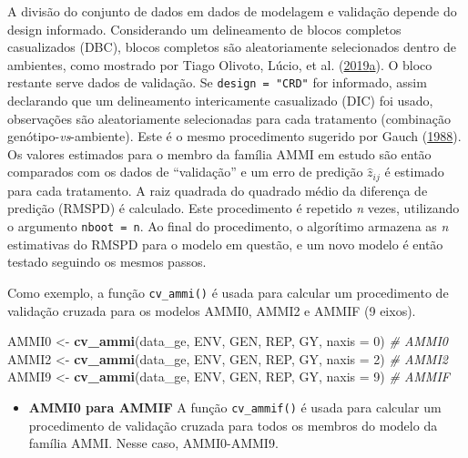 \documentclass[
]{book}
\makeatletter
\newenvironment{Shaded}{\begin{snugshade}}{\end{snugshade}}
\newcommand{\CommentTok}[1]{\textcolor[rgb]{0.56,0.35,0.01}{\textit{#1}}}
\newcommand{\DataTypeTok}[1]{\textcolor[rgb]{0.13,0.29,0.53}{#1}}
\newcommand{\DecValTok}[1]{\textcolor[rgb]{0.00,0.00,0.81}{#1}}
\newcommand{\KeywordTok}[1]{\textcolor[rgb]{0.13,0.29,0.53}{\textbf{#1}}}
\newcommand{\NormalTok}[1]{#1}
\newcommand{\StringTok}[1]{\textcolor[rgb]{0.31,0.60,0.02}{#1}}
\providecommand{\tightlist}{%
  \setlength{\itemsep}{0pt}\setlength{\parskip}{0pt}}
\numberwithin{equation}{section}
\newcommand{\indf}[1]{\index[function]{#1@\texttt{#1()}|ST}}
\makeatother
\begin{document}
A divisão do conjunto de dados em dados de modelagem e validação depende do design informado. Considerando um delineamento de blocos completos casualizados (DBC), blocos completos são aleatoriamente selecionados dentro de ambientes, como mostrado por Tiago Olivoto, Lúcio, et al. (\protect\hyperlink{ref-Olivoto2019}{2019}\protect\hyperlink{ref-Olivoto2019}{a}). O bloco restante serve dados de validação. Se \texttt{design\ =\ "CRD"} for informado, assim declarando que um delineamento intericamente casualizado (DIC)  foi usado, observações são aleatoriamente selecionadas para cada tratamento (combinação genótipo-\emph{vs}-ambiente). Este é o mesmo procedimento sugerido por Gauch (\protect\hyperlink{ref-Gauch1988}{1988}). Os valores estimados para o membro da família AMMI em estudo são então comparados com os dados de ``validação'' e um erro de predição \(\hat{z}_{ij}\) é estimado para cada tratamento. A raiz quadrada do quadrado médio da diferença de predição (RMSPD) é calculado. Este procedimento é repetido \emph{n} vezes, utilizando o argumento \texttt{nboot\ =\ n}. Ao final do procedimento, o algorítimo armazena as \emph{n} estimativas do RMSPD para o modelo em questão, e um novo modelo é então testado seguindo os mesmos passos.

Como exemplo, a função \texttt{cv\_ammi()}\indf{cv\_ammi} é usada para calcular um procedimento de validação cruzada para os modelos AMMI0, AMMI2 e AMMIF (9 eixos).

\begin{Shaded}
\begin{Highlighting}[]
\NormalTok{AMMI0 \textless{}{-}}\StringTok{ }\KeywordTok{cv\_ammi}\NormalTok{(data\_ge, ENV, GEN, REP, GY, }\DataTypeTok{naxis =} \DecValTok{0}\NormalTok{) }\CommentTok{\# AMMI0}
\NormalTok{AMMI2 \textless{}{-}}\StringTok{ }\KeywordTok{cv\_ammi}\NormalTok{(data\_ge, ENV, GEN, REP, GY, }\DataTypeTok{naxis =} \DecValTok{2}\NormalTok{) }\CommentTok{\# AMMI2}
\NormalTok{AMMI9 \textless{}{-}}\StringTok{ }\KeywordTok{cv\_ammi}\NormalTok{(data\_ge, ENV, GEN, REP, GY, }\DataTypeTok{naxis =} \DecValTok{9}\NormalTok{) }\CommentTok{\# AMMIF}
\end{Highlighting}
\end{Shaded}

\begin{itemize}
\tightlist
\item
  \textbf{AMMI0 para AMMIF}
  A função \texttt{cv\_ammif()}\indf{cv\_ammif} é usada para calcular um procedimento de validação cruzada para todos os membros do modelo da família AMMI. Nesse caso, AMMI0-AMMI9.
\end{itemize}
\end{document}
